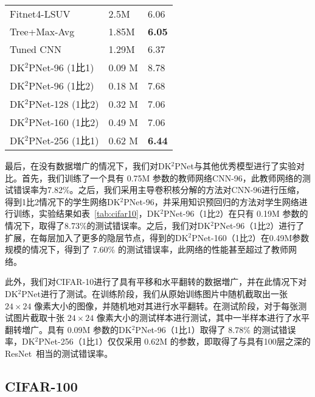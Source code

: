 \begin{table} [!h]
\begin{center}
\begin{tabular}{L{5cm}C{2cm}C{3cm}}
Fitnet4-LSUV~\cite{mishkin2015all} & 2.5M & 6.06 \\
Tree+Max-Avg~\cite{lee2015generalizing} & 1.85M & \bf{6.05} \\
Tuned CNN~\cite{snoek2015scalable} & 1.29M & 6.37 \\
\hline
DK$^2$PNet-96 (1比1) & 0.09 M & {8.78} \\
DK$^2$PNet-96 (1比2) & 0.18 M &{7.68} \\
DK$^2$PNet-128 (1比2) & 0.32 M & 7.06 \\
DK$^2$PNet-160 (1比2) & 0.49 M & 7.06 \\
DK$^2$PNet-256 (1比1) & 0.62 M & \bf{6.44} \\
  \bottomrule[1.5pt]
\end{tabular}
\end{center}
\end{table}

最后，在没有数据増广的情况下，我们对DK$^2$PNet与其他优秀模型进行了实验对比。首先，我们训练了一个具有 0.75M 参数的教师网络CNN-96，此教师网络的测试错误率为7.82\%。之后，我们采用主导卷积核分解的方法对CNN-96进行压缩，得到1比2情况下的学生网络DK$^2$PNet-96，并采用知识预回归的方法对学生网络进行训练，实验结果如表~\ref{tab:cifar10}，DK$^2$PNet-96（1比2）在只有 0.19M 参数的情况下，取得了8.73\%的测试错误率。之后，我们对DK$^2$PNet-96（1比2）进行了扩展，在每层加入了更多的隐层节点，得到的DK$^2$PNet-160（1比2）在0.49M参数规模的情况下，得到了 7.60\% 的测试错误率，此网络的性能甚至超过了教师网络。


此外，我们对CIFAR-10进行了具有平移和水平翻转的数据増广，并在此情况下对DK$^2$PNet进行了测试。在训练阶段，我们从原始训练图片中随机截取出一张 $24\times24$ 像素大小的图像，并随机地对其进行水平翻转。在测试阶段，对于每张测试图片截取十张 $24\times24$ 像素大小的测试样本进行测试，其中一半样本进行了水平翻转増广。具有 0.09M 参数的DK$^2$PNet-96（1比1）取得了 8.78\% 的测试错误率，DK$^2$PNet-256（1比1）仅仅采用 0.62M 的参数，即取得了与具有100层之深的ResNet~\cite{he2015deep}相当的测试错误率。

\subsection{CIFAR-100}
\label{sec:acc:experiment:cifar100}

